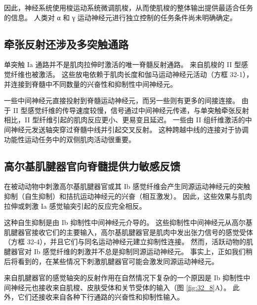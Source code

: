 因此，神经系统使用梭运动系统微调肌梭，从而使肌梭的整体输出提供最适合任务的信息。 人类对 α 和 γ 运动神经元进行独立控制的任务条件尚未明确确定。

\subsection{牵张反射还涉及多突触通路}
单突触 Ia 通路并不是肌肉拉伸时激活的唯一脊髓反射通路。 来自肌梭的 II 型感觉纤维也被激活。 这些放电依赖于肌肉长度和伽马运动神经元活动（方框 32-1），并连接到脊髓中不同数量的兴奋性和抑制性中间神经元。

一些中间神经元直接投射到脊髓运动神经元，而另一些则有更多的间接连接。 由于 II 型感觉纤维的传导速度较慢，信号通过中间神经元传递，与单突触牵张反射相比，II 型纤维引起的肌肉反应更小、更易变且延迟。 一些由 II 组纤维激活的中间神经元发送轴突穿过脊髓中线并引起交叉反射。 这种跨越中线的连接对于协调功能性运动任务中的双侧肌肉活动很重要。

\subsection{高尔基肌腱器官向脊髓提供力敏感反馈}
在被动动物中刺激高尔基肌腱器官或其 Ib 感觉纤维会产生同源运动神经元的突触抑制（自生抑制）和拮抗运动神经元的兴奋（相互激发）。 因此，这些效果与肌肉拉伸或刺激 Ia 感觉轴突引起的反应完全相反。

这种自生抑制是由 Ib 抑制性中间神经元介导的。 这些抑制性中间神经元从高尔基肌腱器官接收它们的主要输入，高尔基肌腱器官是肌肉中发出张力信号的感觉受体（方框 32-4），并且它们与同名运动神经元建立抑制性连接。 然而，活跃动物的肌腱器官对 Ib 感觉纤维的刺激并不总是抑制同源运动神经元。 事实上，正如我们稍后将看到的，在某些情况下刺激肌腱器官可能会激发同源运动神经元。

来自肌腱器官的感觉轴突的反射作用在自然情况下复杂的一个原因是 Ib 抑制性中间神经元也接收来自肌梭、皮肤受体和关节受体的输入（图 \ref{fig:32_8}A）。
此外，它们还接收来自各种下行通路的兴奋性和抑制性输入。

